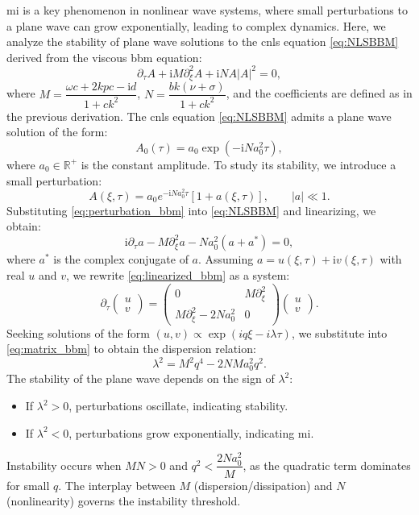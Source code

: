 \documentclass[alpha-refs, 12pt]{wiley-article}
\newcommand{\ui}{\mathrm{i}}
\begin{document}
\acrfull{mi} is a key phenomenon in nonlinear wave systems, where small perturbations to a plane wave can grow exponentially, leading to complex dynamics. Here, we analyze the stability of plane wave solutions to the \acrfull{cnls} equation \eqref{eq:NLSBBM} derived from the viscous \acrfull{bbm} equation:
\[
  \partial_\tau A + \ui M \partial_\xi^2 A + \ui N A |A|^2 = 0,
\]
where $M = \dfrac{\omega c + 2 k p c - \ui d}{1 + c k^2}$, $N = \dfrac{b k (\nu + \sigma)}{1 + c k^2}$, and the coefficients are defined as in the previous derivation. The \acrshort{cnls} equation \eqref{eq:NLSBBM} admits a plane wave solution of the form:
\begin{equation}\label{eq:plane_wave_bbm}
  A_0(\tau) = a_0 \exp(-\ui N a_0^2 \tau),
\end{equation}
where $a_0 \in \mathbb{R}^+$ is the constant amplitude. To study its stability, we introduce a small perturbation:
\begin{equation}\label{eq:perturbation_bbm}
  A(\xi, \tau) = a_0 e^{-\ui N a_0^2 \tau} [1 + a(\xi, \tau)], \qquad |a| \ll 1.
\end{equation}
Substituting \eqref{eq:perturbation_bbm} into \eqref{eq:NLSBBM} and linearizing, we obtain:
\begin{equation}\label{eq:linearized_bbm}
  \ui \partial_\tau a - M \partial_\xi^2 a - N a_0^2 (a + a^*) = 0,
\end{equation}
where $a^*$ is the complex conjugate of $a$. Assuming $a = u(\xi, \tau) + \ui v(\xi, \tau)$ with real $u$ and $v$, we rewrite \eqref{eq:linearized_bbm} as a system:
\begin{equation}\label{eq:matrix_bbm}
  \partial_\tau \begin{pmatrix} u \\ v \end{pmatrix} = \begin{pmatrix}
  0 & M \partial_\xi^2 \\
  M \partial_\xi^2 - 2 N a_0^2 & 0
\end{pmatrix} \begin{pmatrix} u \\ v \end{pmatrix}.
\end{equation}
Seeking solutions of the form $(u, v) \propto \exp(i q \xi - i \lambda \tau)$, we substitute into \eqref{eq:matrix_bbm} to obtain the dispersion relation:
\begin{equation}\label{eq:dispersion_bbm_b}
  \lambda^2 = M^2 q^4 - 2 N M a_0^2 q^2.
\end{equation}
The stability of the plane wave depends on the sign of $\lambda^2$:
\begin{itemize}
  \item If $\lambda^2 > 0$, perturbations oscillate, indicating stability.
  \item If $\lambda^2 < 0$, perturbations grow exponentially, indicating \acrshort{mi}.
\end{itemize}
Instability occurs when $M N > 0$ and $q^2 < \dfrac{2 N a_0^2}{M}$, as the quadratic term dominates for small $q$. The interplay between $M$ (dispersion/dissipation) and $N$ (nonlinearity) governs the instability threshold.
\end{document}
